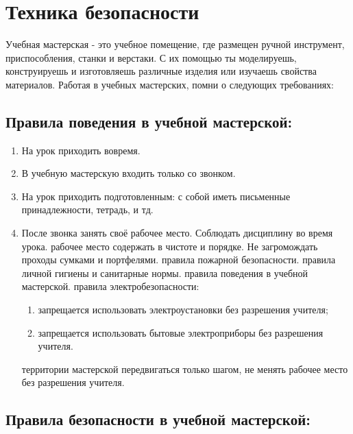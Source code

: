 \section{Техника безопасности}


Учебная мастерская - это учебное помещение, где размещен
ручной инструмент, приспособления, станки и верстаки. С их
помощью ты моделируешь, конструируешь и изготовляешь
различные изделия или изучаешь свойства материалов.
Работая в учебных мастерских, помни о следующих
требованиях:

\subsection{Правила поведения в учебной мастерской:}

\begin{enumerate} 
\item На урок приходить вовремя.
\item  В учебную мастерскую входить только со звонком.
\item На урок приходить подготовленным: с собой иметь
письменные принадлежности, тетрадь, и тд.
\item После звонка занять своё рабочее место. Соблюдать
дисциплину во время урока.
 рабочее место содержать в чистоте и порядке. Не
загромождать проходы сумками и портфелями.
 правила пожарной безопасности.
 правила личной гигиены и санитарные нормы.
 правила поведения в учебной мастерской.
 правила электробезопасности: 
\begin{enumerate} 
самовольно вкл/выкл центральный электрощит; 
\item запрещается использовать электроустановки без разрешения
учителя;
\item запрещается использовать бытовые
электроприборы без разрешения учителя.
\end{enumerate}
 территории мастерской передвигаться только шагом, не
менять рабочее место без разрешения учителя.
\end{enumerate}


\subsection{Правила безопасности в учебной мастерской:}

